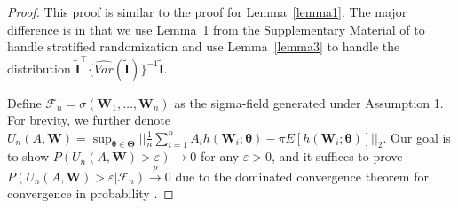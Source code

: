 \documentclass[12pt]{article}
\newcommand{\bW}{\boldsymbol{W}}
\newcommand{\bI}{\boldsymbol{I}}
\newcommand{\btheta}{\boldsymbol{\theta}}
\newcommand{\bTheta}{\boldsymbol{\Theta}}
\begin{document}
\begin{proof}
This proof is similar to the proof for Lemma~\ref{lemma1}. The major difference is in that we use Lemma~1 from the Supplementary Material of \cite{wang2023model} to handle stratified randomization and use Lemma~\ref{lemma3} to handle the distribution $\widetilde{\bI}^\top \{\widehat{Var}(\widetilde{\bI})\}^{-1} \widetilde{\bI}$.

Define $\mathcal{F}_n = \sigma(\bW_1,\dots,\bW_n)$ as the sigma-field generated under Assumption 1. For brevity, we further denote $U_n(A,\bW) = \sup_{\btheta \in \bTheta}||\frac{1}{n} \sum_{i=1}^n A_i h(\bW_i;\btheta) - \pi E[h(\bW_i;\btheta)]||_2$. Our goal is to show $P(U_n(A,\bW) > \varepsilon) \rightarrow 0$ for any $\varepsilon >0$, and it suffices to prove $P(U_n(A,\bW) > \varepsilon | \mathcal{F}_n) \xrightarrow{p} 0$ due to the dominated convergence theorem for convergence in probability \citep[Theorem 1.5.3]{durrett2019probability}. 


\end{proof}
\end{document}
